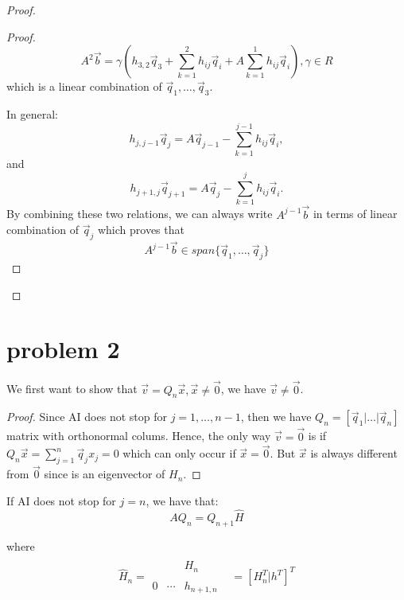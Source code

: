 \documentclass[10pt]{article}
\def\q#1{\vec{q}_{#1}}
\begin{document}
\begin{proof}
\begin{proof}
    \[
    A^2 \vec{b} = \gamma\left( h_{3,2}\q{3} +\sum_{k=1}^2 h_{ij}\q{i} +A\sum_{k=1}^1 h_{ij}\q{i} \right), \gamma \in R
    \]
    which is a linear combination of $\q{1},\dots,\q{3}$. 

    In general:
    \[
      h_{j,j-1}\q{j} = A\q{j-1} - \sum_{k=1}^{j-1} h_{ij}\q{i},
    \]
    and
    \[
      h_{j+1,j}\q{j+1} = A\q{j} - \sum_{k=1}^{j} h_{ij}\q{i}.
    \]
    By combining these two relations, we can always write $A^{j-1}\vec{b}$ in terms of linear combination of $\q{j}$
    which proves that 
    \[
    A^{j-1}\vec{b} \in span \{\q{1},\dots,\q{j}\}
    \]
  \end{proof}
\end{proof}

\section{problem 2}

We first want to show that $\vec{v} = Q_n\vec{x}, \vec{x}\neq \vec{0}$, we have $\vec{v}\neq \vec{0}$.
  \begin{proof}
    Since AI does not stop for $j=1,\dots,n-1$, then we have $Q_n = [\q{1} |\dots|\q{n}]$ matrix with 
  orthonormal colums. Hence, the only way $\vec{v}=\vec{0}$ is if $Q_n \vec{x} = \sum_{j=1}^{n} \q{j}x_j =0$ which 
  can only occur if $\vec{x}=\vec{0}$. But $\vec{x}$ is always different from $\vec{0}$ since is an eigenvector of
  $H_n$.
  \end{proof}
 
  If AI does not stop for $j=n$, we have that:
    \[
     AQ_n = Q_{n+1} \hat{H} 
    \]

    where 
  \[
  \hat{H}_n = 
\begin{array}{|cccc|}
 & & &  \\
 & &H_n& \\ 
 & & &\\ \hline
 0 & \cdots &h_{n+1,n}\\  
\end{array} = [H_n^T | h^T]^T
  \]
\end{document}
